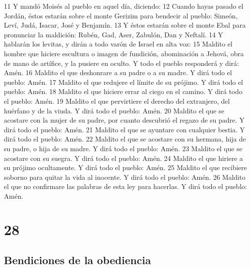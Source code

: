 11 Y mandó Moisés al pueblo en aquel día, diciendo:
12 Cuando hayas pasado el Jordán, éstos estarán sobre el monte Gerizim para bendecir al pueblo: Simeón, Leví, Judá, Isacar, José y Benjamín.
13 Y éstos estarán sobre el monte Ebal para pronunciar la maldición: Rubén, Gad, Aser, Zabulón, Dan y Neftalí.
14 Y hablarán los levitas, y dirán a todo varón de Israel en alta voz:
15 Maldito el hombre que hiciere escultura o imagen de fundición, abominación a Jehová, obra de mano de artífice, y la pusiere en oculto. Y todo el pueblo responderá y dirá: Amén.
16 Maldito el que deshonrare a su padre o a su madre. Y dirá todo el pueblo: Amén.
17 Maldito el que redujere el límite de su prójimo. Y dirá todo el pueblo: Amén.
18 Maldito el que hiciere errar al ciego en el camino. Y dirá todo el pueblo: Amén. 
19 Maldito el que pervirtiere el derecho del extranjero, del huérfano y de la viuda. Y dirá todo el pueblo: Amén.
20 Maldito el que se acostare con la mujer de su padre, por cuanto descubrió el regazo de su padre. Y dirá todo el pueblo: Amén.
21 Maldito el que se ayuntare con cualquier bestia. Y dirá todo el pueblo: Amén.
22 Maldito el que se acostare con su hermana, hija de su padre, o hija de su madre. Y dirá todo el pueblo: Amén.
23 Maldito el que se acostare con su suegra. Y dirá todo el pueblo: Amén.
24 Maldito el que hiriere a su prójimo ocultamente. Y dirá todo el pueblo: Amén.
25 Maldito el que recibiere soborno para quitar la vida al inocente. Y dirá todo el pueblo: Amén.
26 Maldito el que no confirmare las palabras de esta ley para hacerlas. Y dirá todo el pueblo: Amén.

\chapter{28}

\section{Bendiciones de la obediencia}

